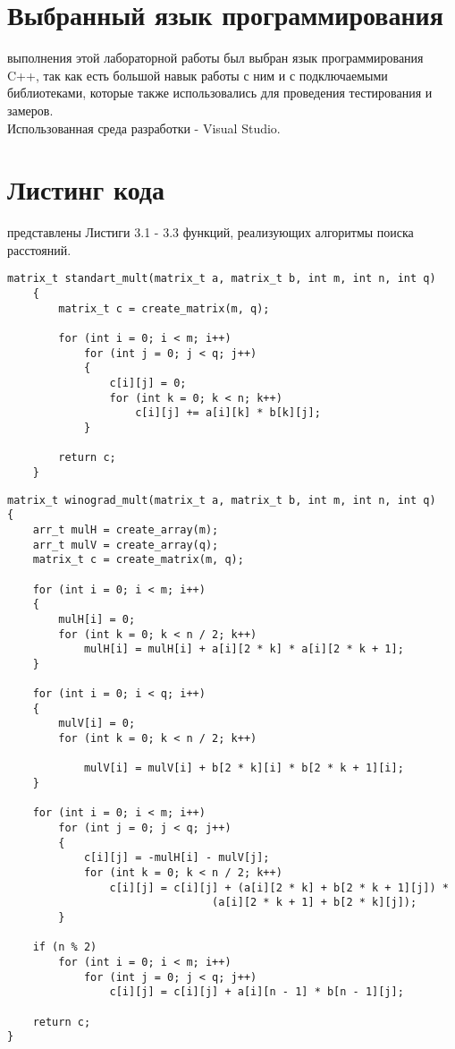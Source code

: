 \section{Выбранный язык программирования}
 выполнения этой лабораторной работы был выбран язык программирования C++, так как есть большой навык работы с ним и с подключаемыми библиотеками, которые также использовались для проведения тестирования и замеров.\\

Использованная среда разработки - Visual Studio.

\section{Листинг кода}
 представлены Листиги 3.1 - 3.3 функций, реализующих алгоритмы поиска расстояний.
\begin{lstlisting}[label=code, caption = Стандартный алгоритм умножения матриц]
	matrix_t standart_mult(matrix_t a, matrix_t b, int m, int n, int q)
	{
		matrix_t c = create_matrix(m, q);
		
		for (int i = 0; i < m; i++)
			for (int j = 0; j < q; j++)
			{
				c[i][j] = 0;
				for (int k = 0; k < n; k++)
					c[i][j] += a[i][k] * b[k][j];
			}
		
		return c;
	}
\end{lstlisting}

\begin{lstlisting}[label=code, caption = Алгоритм Винограда]
matrix_t winograd_mult(matrix_t a, matrix_t b, int m, int n, int q)
{
	arr_t mulH = create_array(m);
	arr_t mulV = create_array(q);
	matrix_t c = create_matrix(m, q);
	
	for (int i = 0; i < m; i++)
	{
		mulH[i] = 0;
		for (int k = 0; k < n / 2; k++)
			mulH[i] = mulH[i] + a[i][2 * k] * a[i][2 * k + 1];
	}
	
	for (int i = 0; i < q; i++)
	{
		mulV[i] = 0;
		for (int k = 0; k < n / 2; k++)
			
			mulV[i] = mulV[i] + b[2 * k][i] * b[2 * k + 1][i];
	}
	
	for (int i = 0; i < m; i++)
		for (int j = 0; j < q; j++)
		{
			c[i][j] = -mulH[i] - mulV[j];
			for (int k = 0; k < n / 2; k++)
				c[i][j] = c[i][j] + (a[i][2 * k] + b[2 * k + 1][j]) * 
						  		(a[i][2 * k + 1] + b[2 * k][j]);
		}
	
	if (n % 2)
		for (int i = 0; i < m; i++)
			for (int j = 0; j < q; j++)
				c[i][j] = c[i][j] + a[i][n - 1] * b[n - 1][j];
	
	return c;
}
\end{lstlisting}

